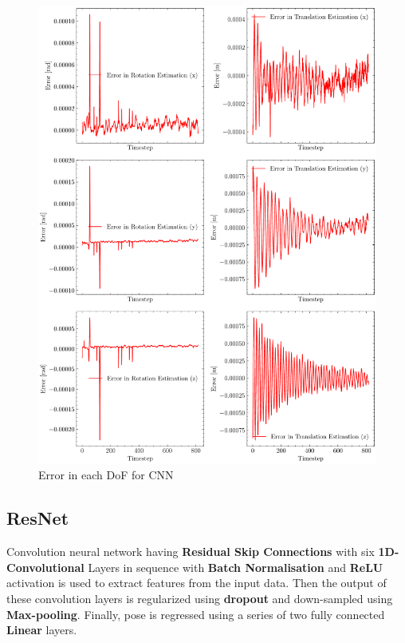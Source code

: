 \begin{figure}[H]
    \centering
    \includegraphics[scale=0.6]{images/fig_chapter4/nn_related/error_in_predicted_vs_ground_truth_cnn.pdf}
    \caption{Error in each DoF for CNN}
    \label{fig:cnn_error}
\end{figure}

\subsection{ResNet}
Convolution neural network having \textbf{Residual Skip Connections} with six \textbf{1D-Convolutional} Layers in sequence with \textbf{Batch Normalisation} and  \textbf{ReLU} activation is used to extract features from the input data. Then the output of these convolution layers is regularized using \textbf{dropout} and down-sampled using \textbf{Max-pooling}. Finally, pose is regressed using a series of two fully connected \textbf{Linear} layers. 

